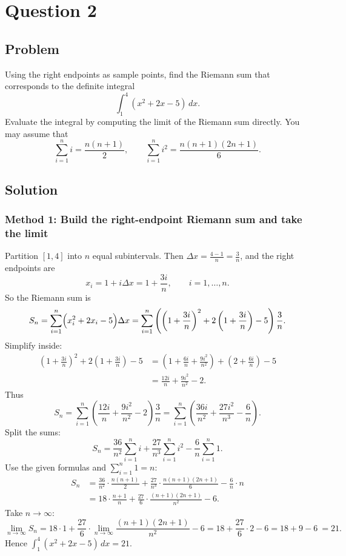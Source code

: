 \documentclass[12pt]{article}
\begin{document}
\newpage
\section*{Question 2}

\subsection*{Problem}

Using the right endpoints as sample points, find the Riemann sum that corresponds to the definite integral
\[
\int_{1}^{4}(x^2+2x-5)\,dx.
\]
Evaluate the integral by computing the limit of the Riemann sum directly. You may assume that
\[
\sum_{i=1}^n i=\frac{n(n+1)}{2},
\qquad
\sum_{i=1}^n i^2=\frac{n(n+1)(2n+1)}{6}.
\]

\subsection*{Solution}

\subsubsection*{Method 1: Build the right-endpoint Riemann sum and take the limit}

Partition \([1,4]\) into \(n\) equal subintervals. Then \(\Delta x=\frac{4-1}{n}=\frac{3}{n}\), and the right endpoints are
\[
x_i = 1+i\Delta x = 1+\frac{3i}{n},\qquad i=1,\dots,n.
\]
So the Riemann sum is
\[
S_n=\sum_{i=1}^{n}\Bigl(x_i^2+2x_i-5\Bigr)\Delta x
=\sum_{i=1}^{n}\left(\left(1+\frac{3i}{n}\right)^2+2\left(1+\frac{3i}{n}\right)-5\right)\frac{3}{n}.
\]
Simplify inside:
\begin{align*}
\left(1+\frac{3i}{n}\right)^2+2\left(1+\frac{3i}{n}\right)-5
&=\left(1+\frac{6i}{n}+\frac{9i^2}{n^2}\right)+\left(2+\frac{6i}{n}\right)-5\\
&=\frac{12i}{n}+\frac{9i^2}{n^2}-2.
\end{align*}
Thus
\[
S_n=\sum_{i=1}^n\left(\frac{12i}{n}+\frac{9i^2}{n^2}-2\right)\frac{3}{n}
=\sum_{i=1}^n\left(\frac{36i}{n^2}+\frac{27i^2}{n^3}-\frac{6}{n}\right).
\]
Split the sums:
\[
S_n=\frac{36}{n^2}\sum_{i=1}^n i + \frac{27}{n^3}\sum_{i=1}^n i^2 - \frac{6}{n}\sum_{i=1}^n 1.
\]
Use the given formulas and \(\sum_{i=1}^n 1=n\):
\begin{align*}
S_n
&=\frac{36}{n^2}\cdot \frac{n(n+1)}{2}
+ \frac{27}{n^3}\cdot \frac{n(n+1)(2n+1)}{6}
- \frac{6}{n}\cdot n\\
&=18\cdot \frac{n+1}{n}
+ \frac{27}{6}\cdot \frac{(n+1)(2n+1)}{n^2}
- 6.
\end{align*}
Take \(n\to\infty\):
\[
\lim_{n\to\infty} S_n
=18\cdot 1 + \frac{27}{6}\cdot \lim_{n\to\infty}\frac{(n+1)(2n+1)}{n^2}-6
=18+\frac{27}{6}\cdot 2 - 6
=18+9-6 \
=21.
\]
Hence \(\boxed{\int_1^4 (x^2+2x-5)\,dx = 21}\).
\end{document}
